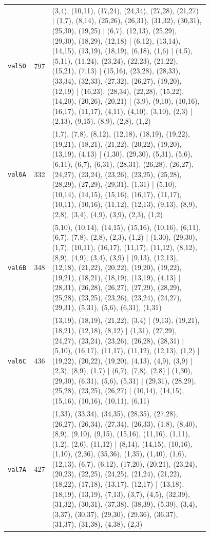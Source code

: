 \begin{landscape}
\begin{longtable}{lr>{\tiny\raggedright\arraybackslash}p{0.78\linewidth}}
\texttt{val5D} & 797 & (3,4), (10,11), (17,24), (24,34), (27,28), (21,27) | (1,7), (8,14), (25,26), (26,31), (31,32), (30,31), (25,30), (19,25) | (6,7), (12,13), (25,29), (29,30), (18,29), (12,18) | (6,12), (13,14), (14,15), (13,19), (18,19), (6,18), (1,6) | (4,5), (5,11), (11,24), (23,24), (22,23), (21,22), (15,21), (7,13) | (15,16), (23,28), (28,33), (33,34), (32,33), (27,32), (26,27), (19,20), (12,19) | (16,23), (28,34), (22,28), (15,22), (14,20), (20,26), (20,21) | (3,9), (9,10), (10,16), (16,17), (11,17), (4,11), (4,10), (3,10), (2,3) | (2,13), (9,15), (8,9), (2,8), (1,2) \\[2pt]
\texttt{val6A} & 332 & (1,7), (7,8), (8,12), (12,18), (18,19), (19,22), (19,21), (18,21), (21,22), (20,22), (19,20), (13,19), (4,13) | (1,30), (29,30), (5,31), (5,6), (6,11), (6,7), (6,31), (28,31), (26,28), (26,27), (24,27), (23,24), (23,26), (23,25), (25,28), (28,29), (27,29), (29,31), (1,31) | (5,10), (10,14), (14,15), (15,16), (16,17), (11,17), (10,11), (10,16), (11,12), (12,13), (9,13), (8,9), (2,8), (3,4), (4,9), (3,9), (2,3), (1,2) \\[2pt]
\texttt{val6B} & 348 & (5,10), (10,14), (14,15), (15,16), (10,16), (6,11), (6,7), (7,8), (2,8), (2,3), (1,2) | (1,30), (29,30), (1,7), (10,11), (16,17), (11,17), (11,12), (8,12), (8,9), (4,9), (3,4), (3,9) | (9,13), (12,13), (12,18), (21,22), (20,22), (19,20), (19,22), (19,21), (18,21), (18,19), (13,19), (4,13) | (28,31), (26,28), (26,27), (27,29), (28,29), (25,28), (23,25), (23,26), (23,24), (24,27), (29,31), (5,31), (5,6), (6,31), (1,31) \\[2pt]
\texttt{val6C} & 436 & (13,19), (18,19), (21,22), (3,4) | (9,13), (19,21), (18,21), (12,18), (8,12) | (1,31), (27,29), (24,27), (23,24), (23,26), (26,28), (28,31) | (5,10), (16,17), (11,17), (11,12), (12,13), (1,2) | (19,22), (20,22), (19,20), (4,13), (4,9), (3,9) | (2,3), (8,9), (1,7) | (6,7), (7,8), (2,8) | (1,30), (29,30), (6,31), (5,6), (5,31) | (29,31), (28,29), (25,28), (23,25), (26,27) | (10,14), (14,15), (15,16), (10,16), (10,11), (6,11) \\[2pt]
\texttt{val7A} & 427 & (1,33), (33,34), (34,35), (28,35), (27,28), (26,27), (26,34), (27,34), (26,33), (1,8), (8,40), (8,9), (9,10), (9,15), (15,16), (11,16), (1,11), (1,2), (2,6), (11,12) | (8,14), (14,15), (10,16), (1,10), (2,36), (35,36), (1,35), (1,40), (1,6), (12,13), (6,7), (6,12), (17,20), (20,21), (23,24), (20,23), (22,25), (24,25), (21,24), (21,22), (18,22), (17,18), (13,17), (12,17) | (13,18), (18,19), (13,19), (7,13), (3,7), (4,5), (32,39), (31,32), (30,31), (37,38), (38,39), (5,39), (3,4), (3,37), (30,37), (29,30), (29,36), (36,37), (31,37), (31,38), (4,38), (2,3) \\[2pt]

\end{longtable}
\end{landscape}
